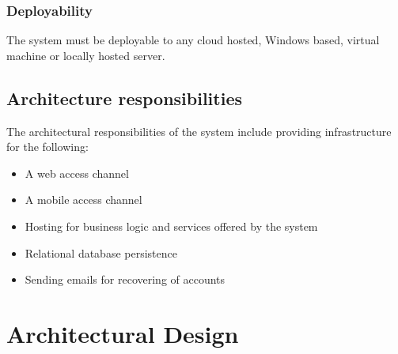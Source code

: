 \documentclass[11pt,a4paper,titlepage]{article}
\begin{document}
		\subsubsection{Deployability}
			The system must be deployable to any cloud hosted, Windows based, virtual machine or locally hosted server.
	\subsection{Architecture responsibilities}
	The architectural responsibilities of the system include providing infrastructure for the following:
		\begin{itemize}
			\item A web access channel
			\item A mobile access channel
			\item Hosting for business logic and services offered by the system
			\item Relational database persistence
			\item Sending emails for recovering of accounts
		\end{itemize}
\section{Architectural Design}
\end{document}
